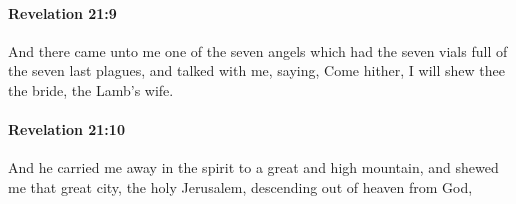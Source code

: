 		\paragraph{Revelation 21:9} %
			\label{REVELATIONNT-21-9}

			And there came unto me one of the seven angels which had the seven vials full of the seven last plagues, and talked with me, saying, Come hither, I will shew thee the bride, the Lamb's wife.

			\begin{framed}
			\scriptsize
				\begin{compactdesc}
					\item[SBLG] 
				\end{compactdesc}
			\end{framed}

		\paragraph{Revelation 21:10} %
			\label{REVELATIONNT-21-10}

			And he carried me away in the spirit to a great and high mountain, and shewed me that great city, the holy Jerusalem, descending out of heaven from God,

